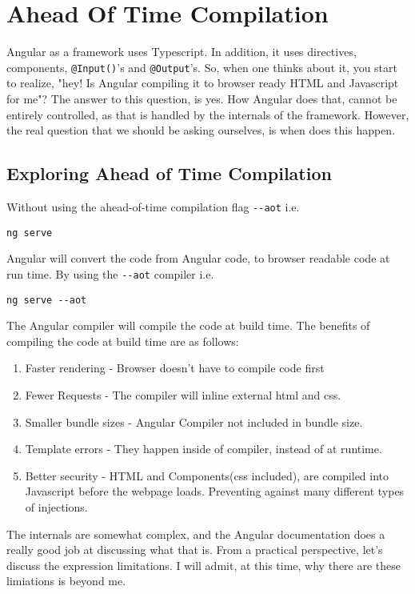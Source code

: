 \chapter{ Ahead Of Time Compilation }
Angular as a framework uses Typescript. In addition, it uses directives, components, 
\lstinline{@Input()}'s and \lstinline{@Output}'s. So, when one thinks about it, you 
start to realize, "hey! Is Angular compiling it to browser ready HTML and Javascript 
for me"? The answer to this question, is yes. How Angular does that, cannot be entirely 
controlled, as that is handled by the internals of the framework. However, the 
real question that we should be asking ourselves, is when does this happen. 

\section{Exploring Ahead of Time Compilation}
Without using the ahead-of-time compilation flag \lstinline{--aot} i.e. 
\begin{verbatim}
ng serve
\end{verbatim}

Angular will convert the code from Angular code, to browser readable 
code at run time. By using the \lstinline{--aot} compiler i.e.
\begin{verbatim}
ng serve --aot
\end{verbatim}

The Angular compiler will compile the code at build time. The benefits 
of compiling the code at build time are as follows: 
\begin{enumerate}
\item Faster rendering - Browser doesn't have to compile code first
\item Fewer Requests - The compiler will inline external html and css.
\item Smaller bundle sizes - Angular Compiler not included in bundle size. 
\item Template errors - They happen inside of compiler, instead of at runtime.
\item Better security - HTML and Components(css included), are compiled into 
Javascript before the webpage loads. Preventing against many different types
of injections. 
\end{enumerate}

The internals are somewhat complex, and the Angular documentation does a really
good job at discussing what that is. From a practical perspective, let's discuss 
the expression limitations. I will admit, at this time, why there are these 
limiations is beyond me. 


